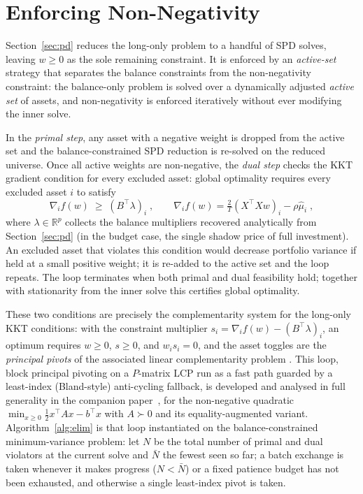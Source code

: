 \section{Enforcing Non-Negativity}\label{sec:primaldual}

Section~\ref{sec:pd} reduces the long-only problem to a handful of SPD solves, leaving
$w \geq 0$ as the sole remaining constraint. It is enforced by an \emph{active-set}
strategy that separates the balance constraints from the non-negativity
constraint: the balance-only problem is solved over a dynamically adjusted \emph{active
set} of assets, and non-negativity is enforced iteratively without ever modifying the
inner solve.

In the \emph{primal step}, any asset with a negative weight is dropped from the active
set and the balance-constrained SPD reduction is re-solved on the reduced universe. Once
all active weights are non-negative, the \emph{dual step} checks the KKT gradient
condition for every excluded asset: global optimality requires every excluded asset $i$
to satisfy
\[
  \nabla_i f(w) \;\geq\; (B^\top\lambda)_i\;,
  \qquad
  \nabla_i f(w) = \tfrac{2}{T}(X^\top Xw)_i - \rho\hat\mu_i\;,
\]
where $\lambda \in \mathbb{R}^p$ collects the balance multipliers recovered analytically
from Section~\ref{sec:pd} (in the budget case, the single shadow price of full
investment). An excluded asset that violates this condition would decrease
portfolio variance if held at a small positive weight; it is re-added to the active set
and the loop repeats. The loop terminates when both primal and dual feasibility hold;
together with stationarity from the inner solve this certifies global optimality.

These two conditions are precisely the complementarity system for the long-only KKT
conditions: with the constraint multiplier $s_i = \nabla_i f(w) - (B^\top\lambda)_i$, an
optimum requires $w \geq 0$, $s \geq 0$, and $w_i s_i = 0$, and the asset toggles are the
\emph{principal pivots} of the associated linear complementarity problem
\cite{judice1994,kim2011,murty1988}. This loop, block principal pivoting on a
$P$-matrix LCP run as a fast path guarded by a least-index (Bland-style) anti-cycling
fallback, is developed and analysed in full generality in the companion
paper~\cite{schmelzer2026nncg}, for the non-negative quadratic
$\min_{x \geq 0} \tfrac{1}{2}x^\top A x - b^\top x$ with $A \succ 0$ and its
equality-augmented variant. Algorithm~\ref{alg:elim} is that loop instantiated on the
balance-constrained minimum-variance problem: let $N$ be the total number of primal and
dual violators at the current solve and $\bar N$ the fewest seen so far; a batch
exchange is taken whenever it makes progress ($N < \bar N$) or a fixed patience budget
has not been exhausted, and otherwise a single least-index pivot is taken.


